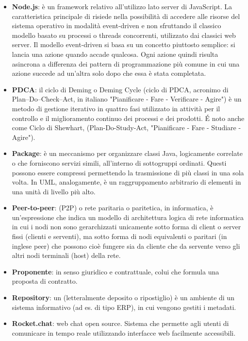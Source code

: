 \begin{itemize}
\item[] \textbf{Node.js}: è un framework relativo all'utilizzo lato server di JavaScript. La caratteristica principale di  risiede nella possibilità di accedere alle risorse del sistema operativo in modalità event-driven e non sfruttando il classico modello basato su processi o threads concorrenti, utilizzato dai classici web server. Il modello event-driven si basa su un concetto piuttosto semplice: si lancia una azione quando accade qualcosa. Ogni azione quindi risulta asincrona a differenza dei pattern di programmazione più comune in cui una azione succede ad un'altra solo dopo che essa è stata completata.
\end{itemize}
\newpage

\begin{itemize}
\item[] \textbf{PDCA}: il ciclo di Deming o Deming Cycle (ciclo di PDCA, acronimo di Plan–Do–Check–Act, in italiano "Pianificare - Fare - Verificare - Agire") è un metodo di gestione iterativo in quattro fasi utilizzato in attività per il controllo e il miglioramento continuo dei processi e dei prodotti. \'E noto anche come Ciclo di Shewhart, (Plan-Do-Study-Act, "Pianificare - Fare - Studiare - Agire").
\item[] \textbf{Package}: è un meccanismo per organizzare classi Java, logicamente correlate o che forniscono servizi simili, all'interno di sottogruppi ordinati. Questi  possono essere compressi permettendo la trasmissione di più classi in una sola volta. In UML, analogamente, è un raggruppamento arbitrario di elementi in una unità di livello più alto.
\item[] \textbf{Peer-to-peer}:  (P2P) o rete paritaria o paritetica, in informatica, è un'espressione che indica un modello di architettura logica di rete informatica in cui i nodi non sono gerarchizzati unicamente sotto forma di client o server fissi (clienti e serventi), ma sotto forma di nodi equivalenti o paritari (in inglese peer) che possono cioè fungere sia da cliente che da servente verso gli altri nodi terminali (host) della rete.
\item[] \textbf{Proponente}: in senso giuridico e contrattuale, colui che formula una proposta di contratto.
\end{itemize}
\newpage

\begin{itemize}
\item[] \textbf{Repository}: un  (letteralmente deposito o ripostiglio) è un ambiente di un sistema informativo (ad es. di tipo ERP), in cui vengono gestiti i metadati.
\item[] \textbf{Rocket.chat}: web chat open source. Sistema che permette agli utenti di comunicare in tempo reale utilizzando interfacce web facilmente accessibili.
\end{itemize}
\newpage


